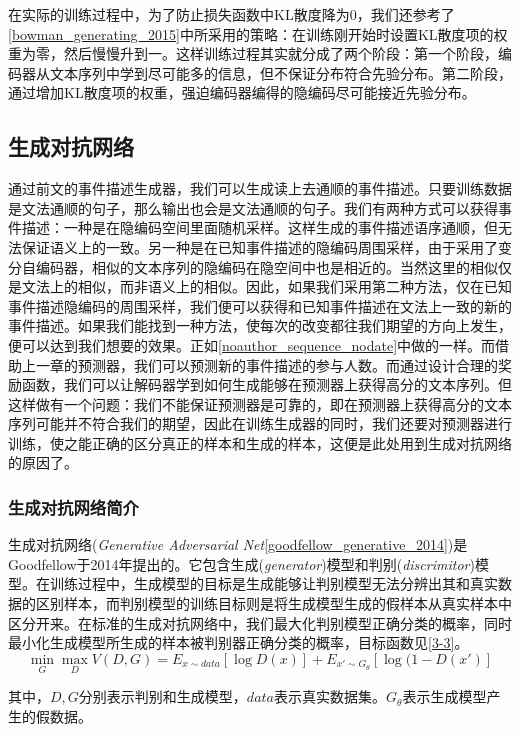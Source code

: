 \documentclass[]{template}
\begin{document}
在实际的训练过程中，为了防止损失函数中KL散度降为0，我们还参考了\ref{bowman_generating_2015}中所采用的策略：在训练刚开始时设置KL散度项的权重为零，然后慢慢升到一。这样训练过程其实就分成了两个阶段：第一个阶段，编码器从文本序列中学到尽可能多的信息，但不保证分布符合先验分布。第二阶段，通过增加KL散度项的权重，强迫编码器编得的隐编码尽可能接近先验分布。

\subsection{生成对抗网络}
通过前文的事件描述生成器，我们可以生成读上去通顺的事件描述。只要训练数据是文法通顺的句子，那么输出也会是文法通顺的句子。我们有两种方式可以获得事件描述：一种是在隐编码空间里面随机采样。这样生成的事件描述语序通顺，但无法保证语义上的一致。另一种是在已知事件描述的隐编码周围采样，由于采用了变分自编码器，相似的文本序列的隐编码在隐空间中也是相近的。当然这里的相似仅是文法上的相似，而非语义上的相似。因此，如果我们采用第二种方法，仅在已知事件描述隐编码的周围采样，我们便可以获得和已知事件描述在文法上一致的新的事件描述。如果我们能找到一种方法，使每次的改变都往我们期望的方向上发生，便可以达到我们想要的效果。正如\ref{noauthor_sequence_nodate}中做的一样。而借助上一章的预测器，我们可以预测新的事件描述的参与人数。而通过设计合理的奖励函数，我们可以让解码器学到如何生成能够在预测器上获得高分的文本序列。但这样做有一个问题：我们不能保证预测器是可靠的，即在预测器上获得高分的文本序列可能并不符合我们的期望，因此在训练生成器的同时，我们还要对预测器进行训练，使之能正确的区分真正的样本和生成的样本，这便是此处用到生成对抗网络的原因了。
\subsubsection{生成对抗网络简介}
生成对抗网络(\textit{Generative Adversarial Net}\ref{goodfellow_generative_2014})是Goodfellow于2014年提出的。它包含生成(\textit{generator})模型和判别(\textit{discrimitor})模型。在训练过程中，生成模型的目标是生成能够让判别模型无法分辨出其和真实数据的区别样本，而判别模型的训练目标则是将生成模型生成的假样本从真实样本中区分开来。在标准的生成对抗网络中，我们最大化判别模型正确分类的概率，同时最小化生成模型所生成的样本被判别器正确分类的概率，目标函数见\ref{3-3}。
\begin{equation}\label{3-3}
    \mathop{min}_G \mathop{max}_D V(D,G)=E_{x\sim data}[\log D(x)]+E_{x'\sim G_\theta}[\log(1-D(x')]
\end{equation}

其中，$D,G$分别表示判别和生成模型，$data$表示真实数据集。$G_\theta$表示生成模型产生的假数据。
\end{document}
